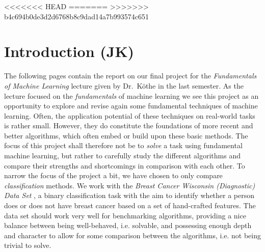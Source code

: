 \documentclass[12pt, a4paper]{scrartcl}
\begin{document}
\tableofcontents
\pagebreak

<<<<<<< HEAD
=======
>>>>>>> b4c694b0de3d2d6768b8c9dad14a7b993574c651



\section{Introduction (JK)}
The following pages contain the report on our final project for the \emph{Fundamentals of Machine Learning} lecture given by Dr.\ Köthe in the last semester. As the lecture focused on the \emph{fundamentals} of machine learning we see this project as an opportunity to explore and revise again some fundamental techniques of machine learning. Often, the application potential of these techniques on real-world tasks is rather small. However, they do constitute the foundations of more recent and better algorithms, which often embed or build upon these basic methods. 
The focus of this project shall therefore not be to \emph{solve} a task using fundamental machine learning, but rather to carefully study the different algorithms and compare their strengths and shortcomings in comparison with each other. To narrow the focus of the project a bit, we have chosen to only compare \emph{classification} methods.
We work with the \emph{Breast Cancer Wisconsin (Diagnostic) Data Set} \cite{street1993nuclear}, a binary classification task with the aim to identify whether a person does or does not have breast cancer based on a set of hand-crafted features. The data set should work very well for benchmarking algorithms, providing a nice balance between being well-behaved, i.e. solvable, and possessing enough depth and character to allow for some comparison between the algorithms, i.e. not being trivial to solve.
\end{document}
